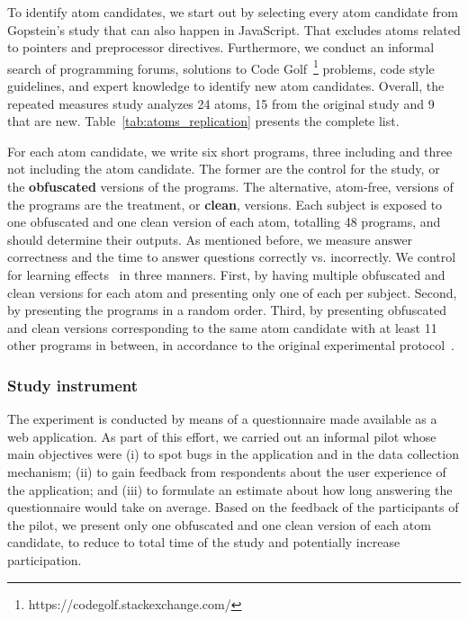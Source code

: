 To identify atom candidates, we start out by selecting every atom candidate from Gopstein's study that can also happen in JavaScript. That excludes atoms related to pointers and preprocessor directives. Furthermore, we conduct an informal search of programming forums, solutions to Code Golf~\footnote{https://codegolf.stackexchange.com/} problems, code style guidelines, and expert knowledge to identify new atom candidates. Overall, the repeated measures study analyzes 24 atoms, 15 from the original study and 9 that are new. Table~\ref{tab:atoms_replication} presents the complete list. 

For each atom candidate, we write six short programs, three including and three not including the atom candidate. The former are the control for the study, or the \textbf{obfuscated} versions of the programs. The alternative, atom-free, versions of the programs are the treatment, or \textbf{clean}, versions. Each subject is exposed to one obfuscated and one clean version of each atom, totalling 48 programs, and should determine their outputs. As mentioned before, we measure answer correctness and the time to answer questions correctly vs. incorrectly. We control for learning effects~\cite{Neely:1991:SPE} in three manners. First, by having multiple obfuscated and clean versions for each atom and presenting only one of each per subject. Second, by presenting the programs in a random order. Third, by presenting obfuscated and clean versions corresponding to the same atom candidate with at least 11 other programs in between, in  accordance to the original experimental protocol~\cite{DBLP:conf/sigsoft/GopsteinIYDZYC17}. 

\subsubsection*{Study instrument} 

The experiment is conducted by means of a questionnaire made available as a web application. As part of this effort, we carried out an informal pilot whose main objectives were (i) to spot bugs in the application and in the data collection mechanism; (ii) to gain feedback from respondents about the user experience of the application; and (iii) to formulate an estimate about how long answering the questionnaire would take on average. Based on the feedback of the participants of the pilot, we present only one obfuscated and one clean version of each atom candidate, to reduce to total time of the study and potentially increase participation.%

